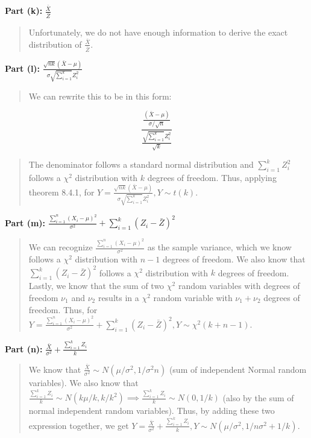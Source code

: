 \documentclass[
]{article}
\begin{document}
\textbf{Part (k):} \(\frac{\bar{X}}{\bar{Z}}\)

\begin{quote}
Unfortunately, we do not have enough information to derive the exact
distribution of \(\frac{\bar{X}}{\bar{Z}}\).
\end{quote}

\textbf{Part (l):}
\(\frac{\sqrt{nk}(\bar{X} - \mu)}{\sigma \sqrt{\sum_{i = 1}^k} Z_i^2}\)

\begin{quote}
We can rewrite this to be in this form:
\end{quote}

\[
\frac{\frac{(\bar{X} - \mu)}{\sigma/\sqrt{n}}}{\frac{ \sqrt{\sum_{i = 1}^k} Z_i^2}{\sqrt{k}}}
\]

\begin{quote}
The denominator follows a standard normal distribution and
\(\sum_{i = 1}^{k} Z_i^2\) follows a \(\chi^2\) distribution with \(k\)
degrees of freedom. Thus, applying theorem 8.4.1, for
\(Y = \frac{\sqrt{nk}(\bar{X} - \mu)}{\sigma \sqrt{\sum_{i = 1}^k} Z_i^2}, Y \sim t(k)\).
\end{quote}

\textbf{Part (m):}
\(\frac{\sum_{i = 1}^{n}(X_i - \mu)^2}{\sigma^2} + \sum_{i = 1}^{k}(Z_i - \bar{Z})^2\)

\begin{quote}
We can recognize \(\frac{\sum_{i = 1}^{n}(X_i - \mu)^2}{\sigma^2}\) as
the sample variance, which we know follows a \(\chi^2\) distribution
with \(n - 1\) degrees of freedom. We also know that
\(\sum_{i = 1}^{k} (Z_i - \bar{Z})^2\) follows a \(\chi^2\) distribution
with \(k\) degrees of freedom. Lastly, we know that the sum of two
\(\chi^2\) random variables with degrees of freedom \(\nu_1\) and
\(\nu_2\) results in a \(\chi^2\) random variable with \(\nu_1 + \nu_2\)
degrees of freedom. Thus, for
\(Y = \frac{\sum_{i = 1}^{n}(X_i - \mu)^2}{\sigma^2} + \sum_{i = 1}^{k}(Z_i - \bar{Z})^2, Y \sim \chi^2(k + n - 1)\).
\end{quote}

\textbf{Part (n):}
\(\frac{\bar{X}}{\sigma^2} + \frac{\sum_{i = 1}^{k} Z_i}{k}\)

\begin{quote}
We know that
\(\frac{\bar{X}}{\sigma^2} \sim N(\mu/\sigma^2, 1/\sigma^2n)\) (sum of
independent Normal random variables). We also know that
\(\frac{\sum_{i = 1}^{k} Z_i}{k} \sim N(k\mu/k, k/k^2) \implies \frac{\sum_{i = 1}^{k} Z_i}{k} \sim N(0, 1/k)\)
(also by the sum of normal independent random variables). Thus, by
adding these two expression together, we get
\(Y = \frac{\bar{X}}{\sigma^2} + \frac{\sum_{i = 1}^{k} Z_i}{k}, Y \sim N(\mu/\sigma^2, 1/n\sigma^2 + 1/k)\).
\end{quote}
\end{document}
